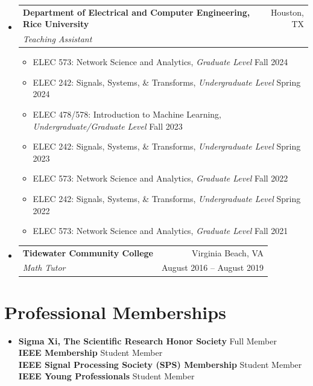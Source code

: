\documentclass[letterpaper,10pt]{article}
\makeatletter
\newcommand{\resumeItem}[1]{\item\small{#1}}
\newcommand{\resumeBullet}[1]{\item[\textbullet]\small{#1}}
\newcommand{\resumeSubheading}[4]{
\vspace{-1pt}\item
  \begin{tabular*}{0.97\textwidth}[t]{l@{\extracolsep{\fill}}r}
    #1 & #2 \\
    #3 & #4 \\
  \end{tabular*}\vspace{-7pt}
}
\newcommand{\resumeSubHeadingList}{\begin{itemize}[leftmargin=0.05in, label={}]}
\newcommand{\resumeSubHeadingListEnd}{\end{itemize}}
\makeatother
\begin{document}
\begin{itemize}[leftmargin=0.25in, label={}]
\begin{itemize}[leftmargin=0.25in, label={}]
\begin{itemize}[leftmargin=0.35in, label={}]
\begin{itemize}[leftmargin=0.28in, label={}]
\resumeSubHeadingList
  \resumeSubheading
      {\textbf{Department of Electrical and Computer Engineering, Rice University}}{Houston, TX \!\!\!\!\!}
      {\textit{Teaching Assistant}}{}
      \vspace{.05cm}
    \resumeSubHeadingList
        \resumeBullet{
            ELEC 573: Network Science and Analytics, \textit{Graduate Level}
            \hfill
            Fall 2024
        }
        \resumeBullet{
            ELEC 242: Signals, Systems, \& Transforms, \textit{Undergraduate Level}
            \hfill
            Spring 2024
        }
        \resumeBullet{
            ELEC 478/578: Introduction to Machine Learning, \textit{Undergraduate/Graduate Level}
            \hfill
            Fall 2023
        }
        \resumeBullet{
            ELEC 242: Signals, Systems, \& Transforms, \textit{Undergraduate Level}
            \hfill
            Spring 2023
        }
        \resumeBullet{
            ELEC 573: Network Science and Analytics, \textit{Graduate Level}
            \hfill
            Fall 2022
        }
        \resumeBullet{
            ELEC 242: Signals, Systems, \& Transforms, \textit{Undergraduate Level}
            \hfill
            Spring 2022
        }
        \resumeBullet{
            ELEC 573: Network Science and Analytics, \textit{Graduate Level}
            \hfill
            Fall 2021
        }
    \resumeSubHeadingListEnd
  \resumeSubheading
      {\textbf{Tidewater Community College}}{Virginia Beach, VA \!\!\!\!\!}
      {\textit{Math Tutor}}{August 2016 -- August 2019 \!\!\!\!\!}
      \vspace{.05cm}
\resumeSubHeadingListEnd

\section{Professional Memberships}

\resumeSubHeadingList
    \resumeItem{
        \textbf{Sigma Xi, The Scientific Research Honor Society}
        \hfill
        Full Member \\[.1cm]
        \textbf{IEEE Membership}
        \hfill
        Student Member \\[.1cm]
        \textbf{IEEE Signal Processing Society (SPS) Membership}
        \hfill
        Student Member \\[.1cm]
        \textbf{IEEE Young Professionals}
        \hfill
        Student Member
    }
\resumeSubHeadingListEnd


\end{itemize}
\end{itemize}
\end{itemize}
\end{itemize}
\end{document}
